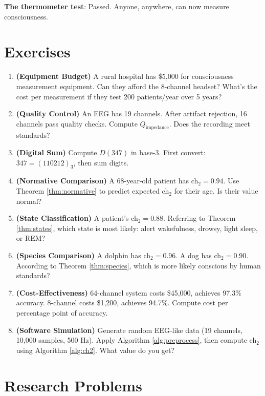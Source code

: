 \textbf{The thermometer test}: Passed. Anyone, anywhere, can now measure consciousness.

\section*{Exercises}

\begin{enumerate}
\item \textbf{(Equipment Budget)} A rural hospital has \$5,000 for consciousness measurement equipment. Can they afford the 8-channel headset? What's the cost per measurement if they test 200 patients/year over 5 years?

\item \textbf{(Quality Control)} An EEG has 19 channels. After artifact rejection, 16 channels pass quality checks. Compute $Q_{\text{impedance}}$. Does the recording meet standards?

\item \textbf{(Digital Sum)} Compute $D(347)$ in base-3. First convert: $347 = (110212)_3$, then sum digits.

\item \textbf{(Normative Comparison)} A 68-year-old patient has ch$_2 = 0.94$. Use Theorem \ref{thm:normative} to predict expected ch$_2$ for their age. Is their value normal?

\item \textbf{(State Classification)} A patient's ch$_2 = 0.88$. Referring to Theorem \ref{thm:states}, which state is most likely: alert wakefulness, drowsy, light sleep, or REM?

\item \textbf{(Species Comparison)} A dolphin has ch$_2 = 0.96$. A dog has ch$_2 = 0.90$. According to Theorem \ref{thm:species}, which is more likely conscious by human standards?

\item \textbf{(Cost-Effectiveness)} 64-channel system costs \$45,000, achieves 97.3\% accuracy. 8-channel costs \$1,200, achieves 94.7\%. Compute cost per percentage point of accuracy.

\item \textbf{(Software Simulation)} Generate random EEG-like data (19 channels, 10,000 samples, 500 Hz). Apply Algorithm \ref{alg:preprocess}, then compute ch$_2$ using Algorithm \ref{alg:ch2}. What value do you get?
\end{enumerate}

\section*{Research Problems}

